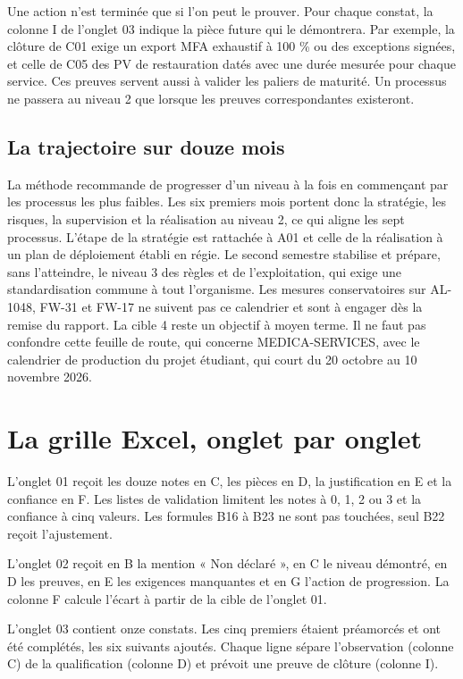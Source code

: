 \documentclass[11pt,a4paper]{article}
\begin{document}
Une action n'est terminée que si l'on peut le prouver. Pour chaque constat, la colonne I de l'onglet 03 indique la pièce future qui le démontrera. Par exemple, la clôture de C01 exige un export MFA exhaustif à 100 \% ou des exceptions signées, et celle de C05 des PV de restauration datés avec une durée mesurée pour chaque service. Ces preuves servent aussi à valider les paliers de maturité. Un processus ne passera au niveau 2 que lorsque les preuves correspondantes existeront.

\subsection{La trajectoire sur douze mois}

La méthode recommande de progresser d'un niveau à la fois en commençant par les processus les plus faibles. Les six premiers mois portent donc la stratégie, les risques, la supervision et la réalisation au niveau 2, ce qui aligne les sept processus. L'étape de la stratégie est rattachée à A01 et celle de la réalisation à un plan de déploiement établi en régie. Le second semestre stabilise et prépare, sans l'atteindre, le niveau 3 des règles et de l'exploitation, qui exige une standardisation commune à tout l'organisme. Les mesures conservatoires sur AL-1048, FW-31 et FW-17 ne suivent pas ce calendrier et sont à engager dès la remise du rapport. La cible 4 reste un objectif à moyen terme. Il ne faut pas confondre cette feuille de route, qui concerne MEDICA-SERVICES, avec le calendrier de production du projet étudiant, qui court du 20 octobre au 10 novembre 2026.

\section{La grille Excel, onglet par onglet}

L'onglet 01 reçoit les douze notes en C, les pièces en D, la justification en E et la confiance en F. Les listes de validation limitent les notes à 0, 1, 2 ou 3 et la confiance à cinq valeurs. Les formules B16 à B23 ne sont pas touchées, seul B22 reçoit l'ajustement.

L'onglet 02 reçoit en B la mention « Non déclaré », en C le niveau démontré, en D les preuves, en E les exigences manquantes et en G l'action de progression. La colonne F calcule l'écart à partir de la cible de l'onglet 01.

L'onglet 03 contient onze constats. Les cinq premiers étaient préamorcés et ont été complétés, les six suivants ajoutés. Chaque ligne sépare l'observation (colonne C) de la qualification (colonne D) et prévoit une preuve de clôture (colonne I).
\end{document}
